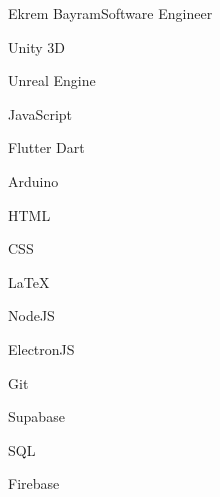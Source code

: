 \documentclass{article}
\begin{document}
\begin{cv}[avatar]{Ekrem Bayram}{Software Engineer}
    \cvseparator
    \begin{cvitem}
        Unity 3D
    \end{cvitem}

    \cvseparator
    \begin{cvitem}
        Unreal Engine
    \end{cvitem}

    \cvseparator
    \begin{cvitem}
        JavaScript
    \end{cvitem}

    \cvseparator
    \begin{cvitem}
        Flutter Dart
    \end{cvitem}

    \cvseparator
    \begin{cvitem}
        Arduino
    \end{cvitem}

    \cvseparator
    \begin{cvitem}
        HTML
    \end{cvitem}

    \cvseparator
    \begin{cvitem}
        CSS
    \end{cvitem}

    \cvseparator
    \begin{cvitem}
        LaTeX
    \end{cvitem}

    \cvseparator
    \begin{cvitem}
        NodeJS
    \end{cvitem}

    \cvseparator
    \begin{cvitem}
        ElectronJS
    \end{cvitem}

    \cvseparator
    \begin{cvitem}
        Git
    \end{cvitem}

    \cvseparator
    \begin{cvitem}
        Supabase
    \end{cvitem}

    \cvseparator
    \begin{cvitem}
        SQL
    \end{cvitem}

    \cvseparator
    \begin{cvitem}
        Firebase
    \end{cvitem}


\end{cv}
\end{document}

